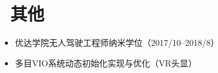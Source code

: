 \documentclass{resume}
\begin{document}

\section{\faCode\ 其他}
\begin{itemize}[parsep=0.5ex]
  \item 优达学院无人驾驶工程师纳米学位（2017/10--2018/8）
  \item 多目VIO系统动态初始化实现与优化（VR头显）
\end{itemize}

%
%
\end{document}
